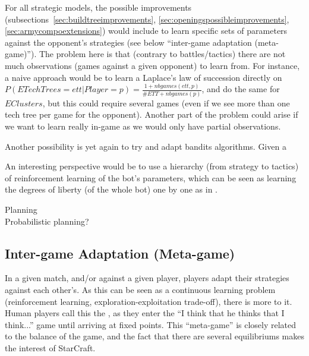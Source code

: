 For all strategic models, the possible improvements (subsections~\ref{sec:buildtreeimprovements}, \ref{sec:openingspossibleimprovements}, \ref{sec:armycompoextensions}) would include to learn specific sets of parameters against the opponent's strategies (see below ``inter-game adaptation (meta-game)''). The problem here is that (contrary to battles/tactics) there are not much observations (games against a given opponent) to learn from. For instance, a naive approach would be to learn a Laplace's law of succession directly on $P(ETechTrees=ett|Player=p)= \frac{1 + nbgames(ett,p)}{\#ETT + nbgames(p)}$, and do the same for $EClusters$, but this could require several games (even if we see more than one tech tree per game for the opponent). Another part of the problem could arise if we want to learn really in-game as we would only have partial observations. %

Another possibility is yet again to try and adapt bandits algorithms. Given a 

An interesting perspective would be to use a hierarchy (from strategy to tactics) of reinforcement learning of the bot's parameters, which can be seen as learning the degrees of liberty (of the whole bot) one by one as in \citep{baranes2009}.


Planning \citep{Wolfe11}\\
Probabilistic planning?



\subsection{Inter-game Adaptation (Meta-game)}
In a given match, and/or against a given player, players adapt their strategies against each other's. As this can be seen as a continuous learning problem (reinforcement learning, exploration-exploitation trade-off), there is more to it. Human players call this the \textit{}, as they enter the ``I think that he thinks that I think...'' game until arriving at fixed points. This ``meta-game'' is closely related to the balance of the game, and the fact that there are several equilibriums makes the interest of StarCraft.

\cite{metalevelbehavioradaptrts} 

\citep{metaMCTS}


